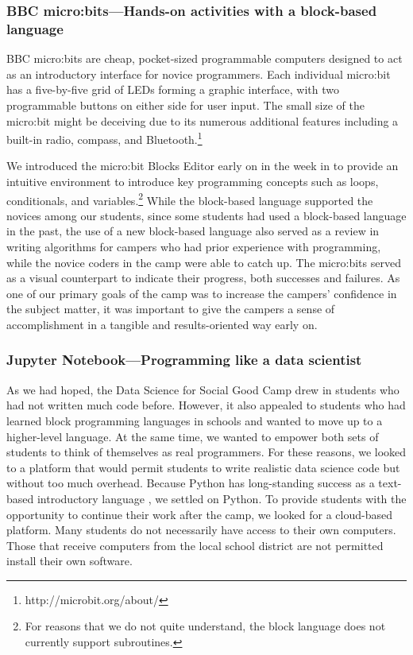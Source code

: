 \subsubsection{BBC micro:bits---Hands-on activities with a block-based language}

BBC micro:bits are cheap, pocket-sized programmable computers
designed to act as an introductory interface for novice programmers.
Each individual micro:bit has a five-by-five grid of LEDs forming
a graphic interface, with two programmable buttons on either side
for user input.  The small size of the micro:bit might be deceiving
due to its numerous additional features including a built-in radio,
compass, and Bluetooth.\footnote{http://microbit.org/about/}

We introduced the micro:bit Blocks Editor early on in the week in
to provide an intuitive environment to introduce key programming
concepts such as loops, conditionals, and variables.\footnote{For
reasons that we do not quite understand, the block language does
not currently support subroutines.} While the block-based language
supported the novices among our students, since some students had
used a block-based language in the past, the use of a new block-based
language also served as a review in writing algorithms for campers
who had prior experience with programming, while the novice coders
in the camp were able to catch up. The micro:bits served as a visual
counterpart to indicate their progress, both successes and failures.
As one of our primary goals of the camp was to increase the campers'
confidence in the subject matter, it was important to give the
campers a sense of accomplishment in a tangible and results-oriented
way early on.

\subsubsection{Jupyter Notebook---Programming like a data scientist}

As we had hoped, the Data Science for Social Good Camp drew in
students who had not written much code before.  However, it also
appealed to students who had learned block programming languages
in schools and wanted to move up to a higher-level language.  At
the same time, we wanted to empower both sets of students to think
of themselves as real programmers.  For these reasons, we looked
to a platform that would permit students to write realistic data
science code but without too much overhead.  Because Python has
long-standing success as a text-based introductory language
\cite{Guo2014}, we settled on Python.  To provide students with the
opportunity to continue their work after the camp, we looked for a
cloud-based platform.  Many students do not necessarily have access
to their own computers.  Those that receive computers from the local
school district are not permitted install their own software.

